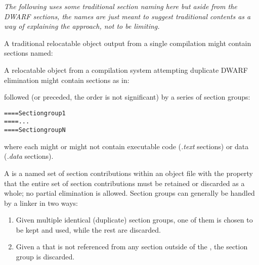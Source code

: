 \textit{The following uses some traditional section naming here
but aside from the DWARF sections, the names are just meant
to suggest traditional contents as a way of explaining the
approach, not to be limiting.}

A traditional relocatable object output 
from a single compilation might contain sections 
named:
\begin{alltt}
\end{alltt}
A relocatable object from a compilation system 
attempting duplicate DWARF elimination might
contain sections as in:

\begin{alltt}
\end{alltt}

followed (or preceded, the order is not significant) 
by a series of 
section groups:
\begin{alltt}
==== Section group 1
==== ...
==== Section group N
\end{alltt}

where each  might or might not contain executable
code (\textit{.text} sections) or data (\textit{.data} sections).

A \textit{} is a named set 
of section contributions
within an object file with the property that the entire set
of section contributions must be retained or discarded as a
whole; no partial elimination is allowed. Section groups can
generally be handled by a linker in two ways:

\begin{enumerate}[1.]
\item Given multiple identical (duplicate) section groups,
one of them is chosen to be kept and used, while the rest
are discarded.

\item Given a  
that is not referenced from any
section outside of the , 
the section group
is discarded.

\end{enumerate}


